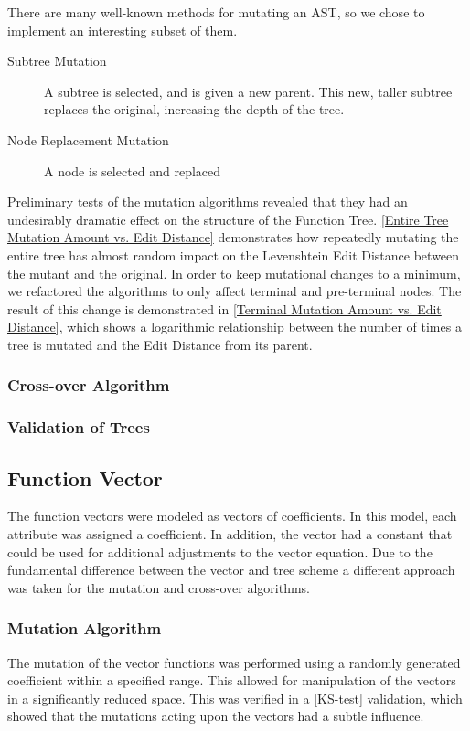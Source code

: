 \documentclass{acm_proc_article-sp}
\begin{document}
There are many well-known methods for mutating an AST, so we chose to implement an interesting subset of them. 
\begin{description}
    \item[Subtree Mutation] A subtree is selected, and is given a new parent. This new, taller subtree replaces the original, increasing the depth of the tree.\cite{geneticprogramming.us}
    \item[Node Replacement Mutation] A node is selected and replaced
\end{description}
    Preliminary tests of the mutation algorithms revealed that they had an undesirably dramatic effect on the structure of the Function Tree. \ref{Entire Tree Mutation Amount vs. Edit Distance} demonstrates how repeatedly mutating the entire tree has almost random impact on the Levenshtein Edit Distance between the mutant and the original. In order to keep mutational changes to a minimum, we refactored the algorithms to only affect terminal and pre-terminal nodes. The result of this change is demonstrated in \ref{Terminal Mutation Amount vs. Edit Distance}, which shows a logarithmic relationship between the number of times a tree is mutated and the Edit Distance from its parent.
    
    \subsubsection{Cross-over Algorithm}
    
    
    
    \subsubsection{Validation of Trees}
    
    
    \subsection{Function Vector}
    
    The function vectors were modeled as vectors of coefficients. In this model, each attribute was assigned a coefficient. In addition, the vector had a constant that could be used for additional adjustments to the vector equation. Due to the fundamental difference between the vector and tree scheme a different approach was taken for the mutation and cross-over algorithms. 
    
    \subsubsection{Mutation Algorithm}
    The mutation of the vector functions was performed using a randomly generated coefficient within a specified range. This allowed for manipulation of the vectors in a significantly reduced space. This was verified in a [KS-test] validation, which showed that the mutations acting upon the vectors had a subtle influence.
    
\end{document}
